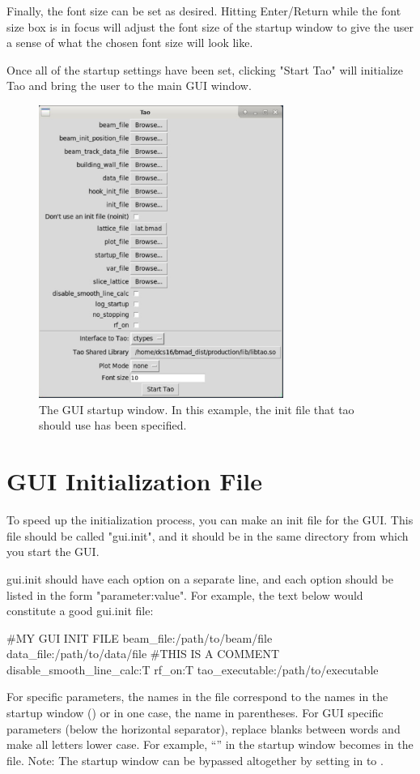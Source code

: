 Finally, the font size can be set as desired. Hitting Enter/Return while the font size box is in
focus will adjust the font size of the startup window to give the user a sense of what the chosen
font size will look like.

Once all of the startup settings have been set, clicking "Start Tao" will initialize Tao and bring
the user to the main GUI window.

\begin{figure}
\includegraphics[width=8cm]{figures/startup.pdf}
\centering
\caption[The GUI startup window.]{The GUI startup window. In this example, the init file that tao should use has been specified.}
\label{fig:startup}
\end{figure}

\section{GUI Initialization File}
\label{s:gui.init.file}

To speed up the initialization process, you can make an init file for the GUI.  This file should be called "gui.init", and it should be in the same directory from which you start the GUI.

gui.init should have each option on a separate line, and each option should be listed in the form "parameter:value".  For example, the text below would constitute a good gui.init file:
\begin{example}
  #MY GUI INIT FILE
  beam_file:/path/to/beam/file
  data_file:/path/to/data/file
  #THIS IS A COMMENT
  disable_smooth_line_calc:T
  rf_on:T
  tao_executable:/path/to/executable
\end{example}
For \tao specific parameters, the names in the  file correspond to the names in the startup window
() or in one case, the name in parentheses. For GUI specific parameters (below the horizontal separator), replace blanks between words and
make all letters lower case. For example, ``'' in the startup window becomes 
in the  file. Note: The startup window can be bypassed altogether by setting  in 
to .

